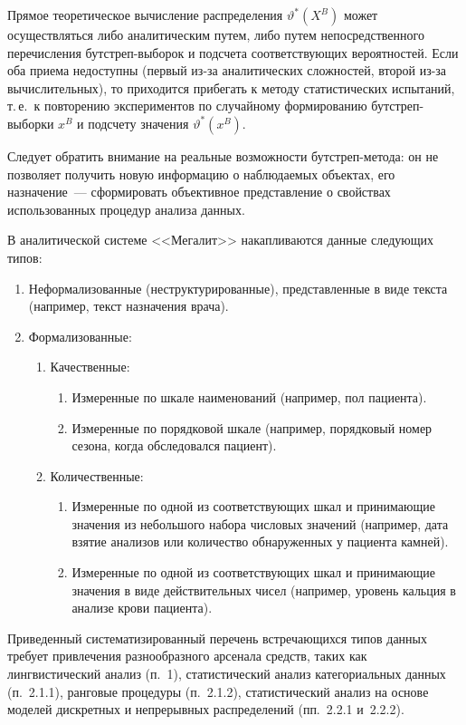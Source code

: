 \begin{multicols}{2}
     Прямое теоретическое вычисление распределения $\vartheta^*(X^B)$ может 
осуществляться либо аналитическим путем, либо путем непосредственного перечис\-ле\-ния 
     бут\-стреп-вы\-бо\-рок и подсчета соответствующих вероятностей. Если оба приема 
недоступны (первый из-за аналитических сложностей, второй из-за вычислительных), то 
приходится прибегать к методу статистических испытаний, т.\,е.\ к повторению экспериментов 
по случайному формированию бут\-стреп-вы\-бор\-ки $x^B$ и подсчету значения 
$\vartheta^*(x^B)$.
     
     Следует обратить внимание на реальные возможности бут\-стреп-ме\-то\-да: он не 
позволяет получить новую информацию о наблюдаемых объектах, его назначение~--- 
сформировать объективное представление о свойствах использованных процедур анализа 
данных.
      
      В аналитической системе <<Мегалит>> накапливаются данные следующих типов:
      \begin{enumerate}[1.]
\item Неформализованные (неструктурированные), представленные в виде текста (например, 
текст назначения врача).
\item Формализованные:
\begin{enumerate}[{2.}1.]
\item Качественные:
\begin{enumerate}[{2.1.}1.]
\item Измеренные по шкале наименований (например, пол пациента).
\item Измеренные по порядковой шкале (например, порядковый номер сезона, когда 
обследовался пациент).
\end{enumerate}
\item Количественные:
\begin{enumerate}[{2.2.}1.]
\item Измеренные по одной из соответствующих шкал и при\-ни\-ма\-ющие значения из 
небольшого \mbox{набора} числовых значений (например, дата взятие анализов или 
количество обнаруженных у пациента камней).
\item Измеренные по одной из соответствующих шкал и принимающие значения в виде 
действительных чисел (например, уровень кальция в анализе крови пациента).
\end{enumerate}
\end{enumerate}
\end{enumerate}
      
      Приведенный систематизированный перечень встречающихся типов данных требует 
привлечения разнообразного арсенала средств, таких как лингвистический анализ (п.~1), 
статистический анализ категориальных данных (п.~2.1.1), ранговые процедуры 
(п.~2.1.2), статистический анализ на основе моделей дискретных и непрерывных 
распределений (пп.~2.2.1 и~2.2.2).
      

\end{multicols}
